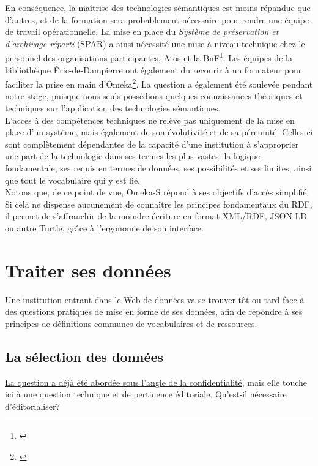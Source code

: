 \documentclass[a4paper,12pt,twoside]{book}
\begin{document}
En conséquence, la maîtrise des technologies sémantiques est moins répandue que d'autres, et de la formation sera probablement nécessaire pour rendre une équipe de travail opérationnelle. La mise en place du \textit{Système de préservation et d'archivage réparti} (SPAR) a ainsi nécessité une mise à niveau technique chez le personnel des organisations participantes, Atos et la BnF\footnote{\cite{poupeauTechnologiesWebSemantique2018}}. Les équipes de la bibliothèque Éric-de-Dampierre ont également du recourir à un formateur pour faciliter la prise en main d'Omeka\footnote{\cite[p.~17]{carbonnelArchivesSciencesHumaines2017}}. La question a également été soulevée pendant notre stage, puisque nous seuls possédions quelques connaissances théoriques et techniques sur l'application des technologies sémantiques.\\

L'accès à des compétences techniques ne relève pas uniquement de la mise en place d'un système, mais également de son évolutivité et de sa pérennité. Celles-ci sont complètement dépendantes de la capacité d'une institution à s'approprier une part de la technologie dans ses termes les plus vastes: la logique fondamentale, ses requis en termes de données, ses possibilités et ses limites, ainsi que tout le vocabulaire qui y est lié.\\

Notons que, de ce point de vue, Omeka-S répond à ses objectifs d'accès simplifié. Si cela ne dispense aucunement de connaître les principes fondamentaux du RDF, il permet de s'affranchir de la moindre écriture en format XML/RDF, JSON-LD ou autre Turtle, grâce à l'ergonomie de son interface.\\



\section{Traiter ses données}

Une institution entrant dans le Web de données va se trouver tôt ou tard face à des questions pratiques de mise en forme de ses données, afin de répondre à ses principes de définitions communes de vocabulaires et de ressources. 


\subsection{La sélection des données}

\hyperref[3-confidentialite]{La question a déjà été abordée sous l'angle de la confidentialité}, mais elle touche ici à une question technique et de pertinence éditoriale. Qu'est-il nécessaire d'éditorialiser?\\
\end{document}
